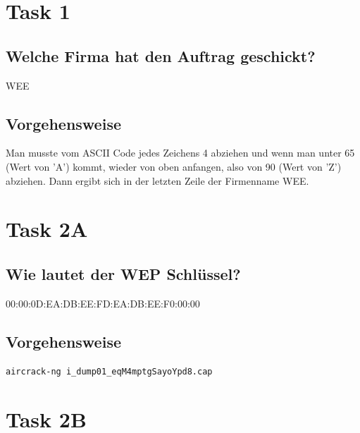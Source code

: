 \documentclass[12pt,a4paper,titlepage,oneside]{scrartcl}
\begin{document}
\maketitle
\setcounter{section}{0}
\setcounter{tocdepth}{2}
\tableofcontents

%
%

\section{Task 1}

\subsection{Welche Firma hat den Auftrag geschickt?}

WEE

\subsection{Vorgehensweise}

Man musste vom ASCII Code jedes Zeichens 4 abziehen und wenn man unter 65 (Wert von 'A') kommt, wieder von oben anfangen, also von 90 (Wert von 'Z') abziehen. Dann ergibt sich in der letzten Zeile der Firmenname WEE.

\section{Task 2A}

\subsection{Wie lautet der WEP Schlüssel?}

00:00:0D:EA:DB:EE:FD:EA:DB:EE:F0:00:00

\subsection{Vorgehensweise}

\begin{lstlisting}
aircrack-ng i_dump01_eqM4mptgSayoYpd8.cap
\end{lstlisting}

\section{Task 2B}
\end{document}
